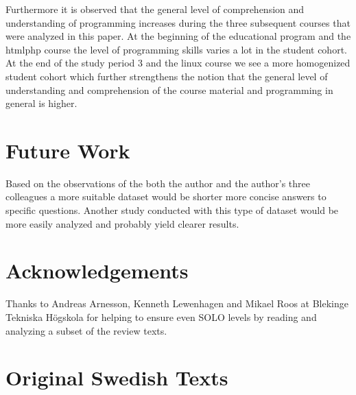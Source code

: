 \documentclass[twoside,twocolumn,a4paper,11pt,english]{article}
\begin{document}
Furthermore it is observed that the general level of comprehension and understanding of programming increases during the three subsequent courses that were analyzed in this paper. At the beginning of the educational program and the htmlphp course the level of programming skills varies a lot in the student cohort. At the end of the study period 3 and the linux course we see a more homogenized student cohort which further strengthens the notion that the general level of understanding and comprehension of the course material and programming in general is higher.




\section{Future Work} \label{future}

Based on the observations of the both the author and the author's three colleagues a more suitable dataset would be shorter more concise answers to specific questions. Another study conducted with this type of dataset would be more easily analyzed and probably yield clearer results.




\section{Acknowledgements}

Thanks to Andreas Arnesson, Kenneth Lewenhagen and Mikael Roos at Blekinge Tekniska Högskola for helping to ensure even SOLO levels by reading and analyzing a subset of the review texts.







\newpage

\appendix

\section{Original Swedish Texts} \label{app:original}
\end{document}
